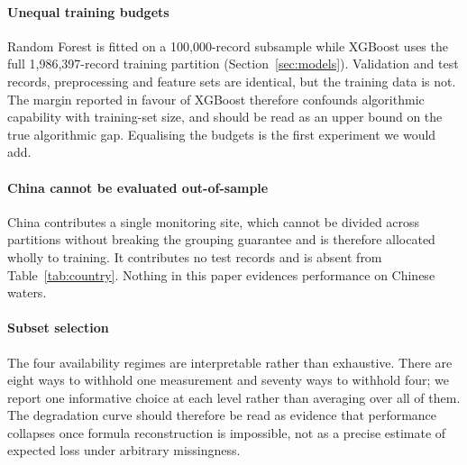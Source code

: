 \paragraph{Unequal training budgets}
Random Forest is fitted on a 100{,}000-record subsample while XGBoost uses the full
1{,}986{,}397-record training partition (Section~\ref{sec:models}). Validation and test
records, preprocessing and feature sets are identical, but the training data is not. The
margin reported in favour of XGBoost therefore confounds algorithmic capability with
training-set size, and should be read as an upper bound on the true algorithmic gap.
Equalising the budgets is the first experiment we would add.

\paragraph{China cannot be evaluated out-of-sample}
China contributes a single monitoring site, which cannot be divided across partitions
without breaking the grouping guarantee and is therefore allocated wholly to training. It
contributes no test records and is absent from Table~\ref{tab:country}. Nothing in this
paper evidences performance on Chinese waters.

\paragraph{Subset selection}
The four availability regimes are interpretable rather than exhaustive. There are eight
ways to withhold one measurement and seventy ways to withhold four; we report one
informative choice at each level rather than averaging over all of them. The degradation
curve should therefore be read as evidence that performance collapses once formula
reconstruction is impossible, not as a precise estimate of expected loss under arbitrary
missingness.
